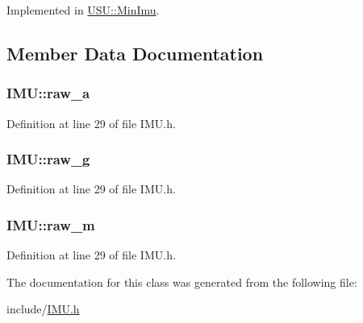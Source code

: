 \-Implemented in \hyperlink{class_u_s_u_1_1_min_imu_add98c9a8e002a56ccb4978079ac2dbfe}{\-U\-S\-U\-::\-Min\-Imu}.



\subsection{\-Member \-Data \-Documentation}
\hypertarget{class_i_m_u_acd6307b0f4f44bd6f057cd8f85080668}{
\subsubsection[{raw\-\_\-a}]{ {\bf \-I\-M\-U\-::raw\-\_\-a}}}\label{class_i_m_u_acd6307b0f4f44bd6f057cd8f85080668}


\-Definition at line 29 of file \-I\-M\-U.\-h.

\hypertarget{class_i_m_u_aa63b8395ba841c899a926fc47d4a2435}{
\subsubsection[{raw\-\_\-g}]{ {\bf \-I\-M\-U\-::raw\-\_\-g}}}\label{class_i_m_u_aa63b8395ba841c899a926fc47d4a2435}


\-Definition at line 29 of file \-I\-M\-U.\-h.

\hypertarget{class_i_m_u_ad822d0a58bd3050a42cd377453521b5f}{
\subsubsection[{raw\-\_\-m}]{ {\bf \-I\-M\-U\-::raw\-\_\-m}}}\label{class_i_m_u_ad822d0a58bd3050a42cd377453521b5f}


\-Definition at line 29 of file \-I\-M\-U.\-h.



\-The documentation for this class was generated from the following file\-:\begin{DoxyCompactItemize}
\item 
include/\hyperlink{_i_m_u_8h}{\-I\-M\-U.\-h}\end{DoxyCompactItemize}
